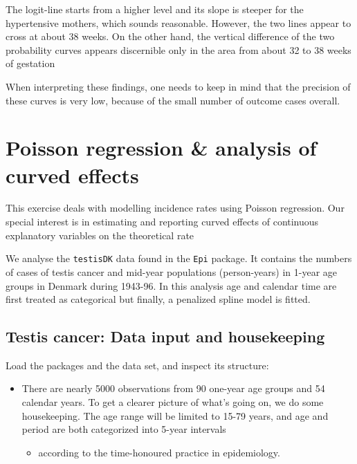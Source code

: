 \documentclass[
]{book}
\providecommand{\tightlist}{%
  \setlength{\itemsep}{0pt}\setlength{\parskip}{0pt}}
\begin{document}
The logit-line starts from a higher level and its slope is steeper
for the hypertensive mothers, which sounds reasonable.
However, the two lines
appear to cross at about 38 weeks. On the other hand, the vertical difference
of the two probability curves appears discernible only in the area
from about 32 to 38 weeks of gestation

When interpreting these findings, one needs to keep in mind that
the precision of these curves is very low, because of
the small number of outcome cases overall.

\chapter{Poisson regression \& analysis of curved effects}\label{poisson-regression-analysis-of-curved-effects}

This exercise deals with modelling incidence rates
using Poisson regression. Our special interest is in
estimating and reporting curved effects of continuous
explanatory variables on the theoretical rate

We analyse the \texttt{testisDK} data found in the
\texttt{Epi} package.
It contains the numbers of cases of testis cancer and mid-year
populations (person-years) in 1-year age groups in Denmark during
1943-96. In this analysis age and calendar time
are first treated as categorical
but finally, a penalized spline model is fitted.

\section{Testis cancer: Data input and housekeeping}\label{testis-cancer-data-input-and-housekeeping}

Load the packages and the data set, and inspect its structure:

\begin{itemize}
\tightlist
\item
  There are nearly 5000 observations from 90 one-year age groups
  and 54 calendar years. To get a clearer picture of what's going on,
  we do some housekeeping. The age range will be limited to 15-79
  years, and age and period are both categorized into 5-year intervals

  \begin{itemize}
  \tightlist
  \item
    according to the time-honoured practice in epidemiology.
  \end{itemize}
\end{itemize}
\end{document}
